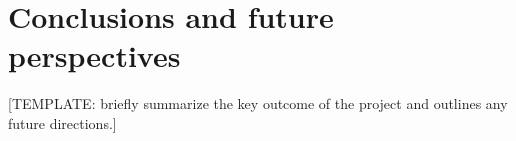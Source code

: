 \chapter{Conclusions and future perspectives} %

[TEMPLATE: briefly summarize the key outcome of the project and outlines any future directions.]
